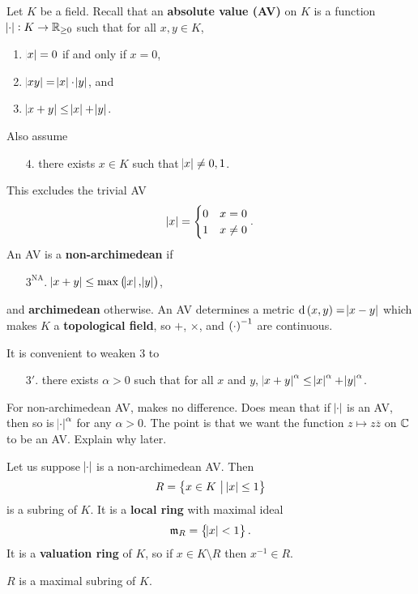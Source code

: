 Let $ K $ be a field. Recall that an \textbf{absolute value (AV)} on $ K $ is a function $ \abs{\cdot} : K \to \mathbb{R}_{\ge 0} $ such that for all $ x, y \in K $,
\begin{enumerate}
\item $ \abs{x} = 0 $ if and only if $ x = 0 $,
\item $ \abs{xy} = \abs{x} \cdot \abs{y} $, and
\item $ \abs{x + y} \le \abs{x} + \abs{y} $.
\end{enumerate}
Also assume
\begin{itemize}
\item[$ 4 $.] there exists $ x \in K $ such that $ \abs{x} \ne 0, 1 $.
\end{itemize}
This excludes the trivial AV
$$ \abs{x} =
\begin{cases}
0 & x = 0 \\
1 & x \ne 0
\end{cases}.
$$
An AV is a \textbf{non-archimedean} if
\begin{itemize}
\item[$ 3^{\text{NA}} $.] $ \abs{x + y} \le \max\br{\abs{x}, \abs{y}} $,
\end{itemize}
and \textbf{archimedean} otherwise. An AV determines a metric $ \d\br{x, y} = \abs{x - y} $ which makes $ K $ a \textbf{topological field}, so $ + $, $ \times $, and $ \br{\cdot}^{-1} $ are continuous.

\begin{remark*}
It is convenient to weaken $ 3 $ to
\begin{itemize}
\item[$ 3' $.] there exists $ \alpha > 0 $ such that for all $ x $ and $ y $, $ \abs{x + y}^\alpha \le \abs{x}^\alpha + \abs{y}^\alpha $.
\end{itemize}
For non-archimedean AV, makes no difference. Does mean that if $ \abs{\cdot} $ is an AV, then so is $ \abs{\cdot}^\alpha $ for any $ \alpha > 0 $. The point is that we want the function $ z \mapsto z\overline{z} $ on $ \mathbb{C} $ to be an AV. Explain why later.
\end{remark*}

Let us suppose $ \abs{\cdot} $ is a non-archimedean AV. Then
$$ R = \cbr{x \in K \st \abs{x} \le 1} $$
is a subring of $ K $. It is a \textbf{local ring} with maximal ideal
$$ \mmm_R = \cbr{\abs{x} < 1}. $$
It is a \textbf{valuation ring} of $ K $, so if $ x \in K \setminus R $ then $ x^{-1} \in R $.

\begin{lemma}
\label{lem:1.1}
$ R $ is a maximal subring of $ K $.
\end{lemma}

